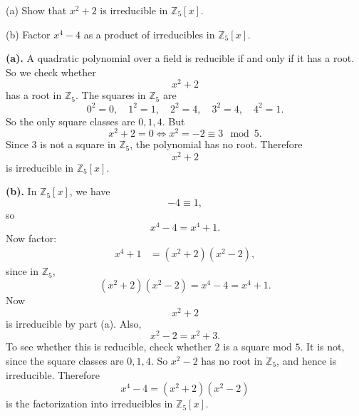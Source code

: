 \begin{problem}{
    (a) Show that $x^2+2$ is irreducible in $\mathbb{Z}_5[x]$.

    (b) Factor $x^4-4$ as a product of irreducibles in $\mathbb{Z}_5[x]$.
}
    \textbf{(a).}
    A quadratic polynomial over a field is reducible if and only if it has a root.
    So we check whether
    \[
        x^2+2
    \]
    has a root in $\mathbb{Z}_5$.
    The squares in $\mathbb{Z}_5$ are
    \[
        0^2=0,\quad 1^2=1,\quad 2^2=4,\quad 3^2=4,\quad 4^2=1.
    \]
    So the only square classes are $0,1,4$.
    But
    \[
        x^2+2=0
        \iff
        x^2= -2 \equiv 3 \mod 5.
    \]
    Since $3$ is not a square in $\mathbb{Z}_5$, the polynomial has no root.
    Therefore
    \[
        x^2+2
    \]
    is irreducible in $\mathbb{Z}_5[x]$.

    \textbf{(b).}
    In $\mathbb{Z}_5[x]$, we have
    \[
        -4\equiv 1,
    \]
    so
    \[
        x^4-4=x^4+1.
    \]
    Now factor:
    \begin{align*}
        x^4+1
        &=
        (x^2+2)(x^2-2),
    \end{align*}
    since in $\mathbb{Z}_5$,
    \[
        (x^2+2)(x^2-2)=x^4-4=x^4+1.
    \]
    Now
    \[
        x^2+2
    \]
    is irreducible by part (a).
    Also,
    \[
        x^2-2=x^2+3.
    \]
    To see whether this is reducible, check whether $2$ is a square mod $5$.
    It is not, since the square classes are $0,1,4$.
    So $x^2-2$ has no root in $\mathbb{Z}_5$, and hence is irreducible.
    Therefore
    \[
        x^4-4=(x^2+2)(x^2-2)
    \]
    is the factorization into irreducibles in $\mathbb{Z}_5[x]$.
\end{problem}


